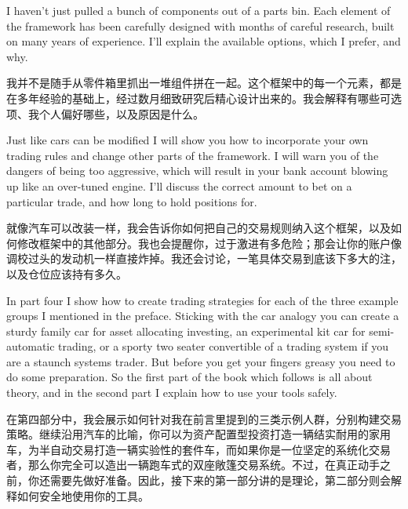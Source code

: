 \begin{englishblock} I haven't just pulled a bunch of components out of a parts bin. Each element of the framework has been carefully designed with months of careful research, built on many years of experience. I'll explain the available options, which I prefer, and why. \end{englishblock}

\begin{chineseblock}我并不是随手从零件箱里抓出一堆组件拼在一起。这个框架中的每一个元素，都是在多年经验的基础上，经过数月细致研究后精心设计出来的。我会解释有哪些可选项、我个人偏好哪些，以及原因是什么。\end{chineseblock}

\bipairgap

\begin{englishblock} Just like cars can be modified I will show you how to incorporate your own trading rules and change other parts of the framework. I will warn you of the dangers of being too aggressive, which will result in your bank account blowing up like an over-tuned engine. I'll discuss the correct amount to bet on a particular trade, and how long to hold positions for. \end{englishblock}

\begin{chineseblock}就像汽车可以改装一样，我会告诉你如何把自己的交易规则纳入这个框架，以及如何修改框架中的其他部分。我也会提醒你，过于激进有多危险；那会让你的账户像调校过头的发动机一样直接炸掉。我还会讨论，一笔具体交易到底该下多大的注，以及仓位应该持有多久。\end{chineseblock}

\bipairgap

\begin{englishblock} In part four I show how to create trading strategies for each of the three example groups I mentioned in the preface. Sticking with the car analogy you can create a sturdy family car for asset allocating investing, an experimental kit car for semi-automatic trading, or a sporty two seater convertible of a trading system if you are a staunch systems trader. But before you get your fingers greasy you need to do some preparation. So the first part of the book which follows is all about theory, and in the second part I explain how to use your tools safely. \end{englishblock}

\begin{chineseblock}在第四部分中，我会展示如何针对我在前言里提到的三类示例人群，分别构建交易策略。继续沿用汽车的比喻，你可以为资产配置型投资打造一辆结实耐用的家用车，为半自动交易打造一辆实验性的套件车，而如果你是一位坚定的系统化交易者，那么你完全可以造出一辆跑车式的双座敞篷交易系统。不过，在真正动手之前，你还需要先做好准备。因此，接下来的第一部分讲的是理论，第二部分则会解释如何安全地使用你的工具。\end{chineseblock}
